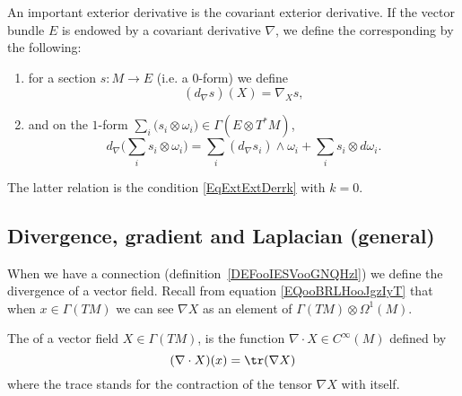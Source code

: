 An important exterior derivative is the covariant exterior derivative. If the vector bundle $E$ is endowed by a covariant derivative $\nabla$, we define the corresponding  by the following:
{
\renewcommand{\theenumi}{\arabic{enumi}.}
\begin{enumerate}
	\item for a section $s\colon M\to E$ (i.e. a $0$-form) we define
	      \begin{equation}
		      (d_{\nabla}s)(X)=\nabla_Xs,
	      \end{equation}
	\item and on the $1$-form $\sum_i(s_i\otimes\omega_i \big)\in\Gamma(E\otimes T^*M)$,
	      \begin{equation}
		      d_{\nabla}\big( \sum_is_i\otimes\omega_i \big)=\sum_i(d_{\nabla}s_i)\wedge\omega_i+\sum_is_i\otimes d\omega_i.
	      \end{equation}
\end{enumerate}
}		%
The latter relation is the condition \eqref{EqExtExtDerrk} with $k=0$.

\subsection{Divergence, gradient and Laplacian (general)}

When we have a connection (definition~\ref{DEFooIESVooGNQHzl}) we define the divergence of a vector field. Recall from equation \eqref{EQooBRLHooJgzIyT} that when \( x\in\Gamma(TM)\) we can see \( \nabla X\) as an element of \( \Gamma(TM)\otimes \Omega^1(M)\).
\begin{definition}      \label{DEFooTTSFooDdgiKg}
	The  of a vector field $X\in \Gamma(TM)$, is the function $\nabla\cdot X\in C^{\infty}(M)$ defined by
	\begin{equation}
		(\nabla\cdot X)(x)=\tr(\nabla X)
	\end{equation}
	where the trace stands for the contraction of the tensor \( \nabla X\) with itself.
\end{definition}

